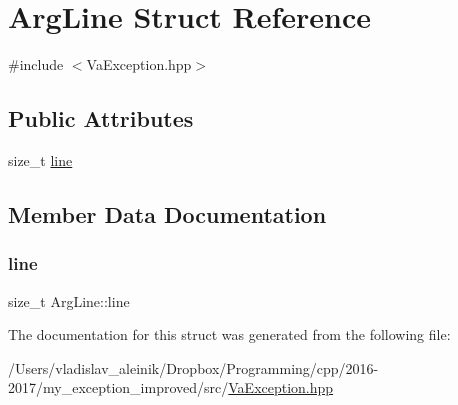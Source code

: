 \hypertarget{struct_arg_line}{}\section{Arg\+Line Struct Reference}
\label{struct_arg_line}


{\ttfamily \#include $<$Va\+Exception.\+hpp$>$}

\subsection*{Public Attributes}
\begin{DoxyCompactItemize}
\item 
size\+\_\+t \hyperlink{struct_arg_line_ae24c688fec3e284f0dd99287451b66bc}{line}
\end{DoxyCompactItemize}


\subsection{Member Data Documentation}
\mbox{\label{struct_arg_line_ae24c688fec3e284f0dd99287451b66bc}} 
\subsubsection{\texorpdfstring{line}{line}}
{\footnotesize\ttfamily size\+\_\+t Arg\+Line\+::line}



The documentation for this struct was generated from the following file\+:\begin{DoxyCompactItemize}
\item 
/\+Users/vladislav\+\_\+aleinik/\+Dropbox/\+Programming/cpp/2016-\/2017/my\+\_\+exception\+\_\+improved/src/\hyperlink{_va_exception_8hpp}{Va\+Exception.\+hpp}\end{DoxyCompactItemize}
